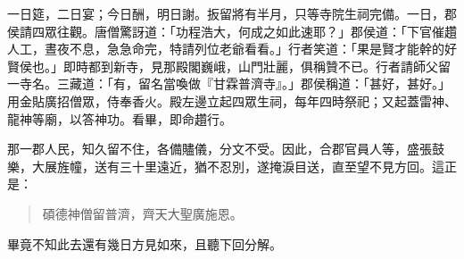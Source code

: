 一日筵，二日宴；今日酬，明日謝。扳留將有半月，只等寺院生祠完備。一日，郡侯請四眾往觀。唐僧驚訝道：「功程浩大，何成之如此速耶？」郡侯道：「下官催趲人工，晝夜不息，急急命完，特請列位老爺看看。」行者笑道：「果是賢才能幹的好賢侯也。」即時都到新寺，見那殿閣巍峨，山門壯麗，俱稱贊不已。行者請師父留一寺名。三藏道：「有，留名當喚做『甘霖普濟寺』。」郡侯稱道：「甚好，甚好。」用金貼廣招僧眾，侍奉香火。殿左邊立起四眾生祠，每年四時祭祀；又起蓋雷神、龍神等廟，以答神功。看畢，即命趲行。

那一郡人民，知久留不住，各備贐儀，分文不受。因此，合郡官員人等，盛張鼓樂，大展旌幢，送有三十里遠近，猶不忍別，遂掩淚目送，直至望不見方回。這正是：
\begin{quote}
碩德神僧留普濟，齊天大聖廣施恩。
\end{quote}

畢竟不知此去還有幾日方見如來，且聽下回分解。
